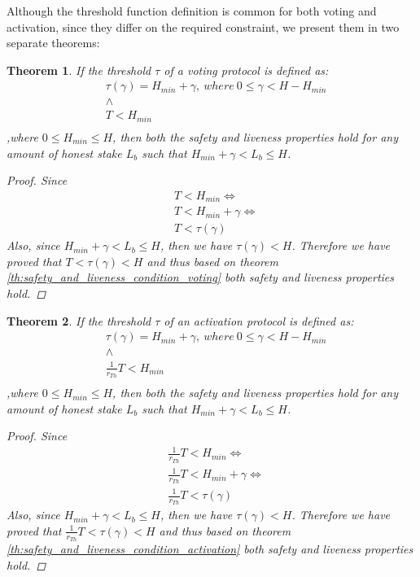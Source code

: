 \documentclass[11pt,a4paper]{article}
\newtheorem{proof}{Proof}
\newtheorem{theorem}{Theorem}
\begin{document}
Although the threshold function definition is common for both voting and
activation, since they differ on the required constraint, we present them in
two separate theorems:
\begin{theorem}\label{th:proposed_voting_threshold}
	If the threshold $\tau$ of a voting protocol is
	defined as:
	\begin{align*}
		&\tau(\gamma) = H_{min} + \gamma,\ where\ 0 \leq \gamma < H-H_{min} \\
		&\land\\
		&T < H_{min}\\
	\end{align*}
,where  $0 \leq H_{min} \leq H$,
then both the safety and liveness properties hold for any amount of honest
stake $L_b$ such that $H_{min} + \gamma < L_b \leq H$.
	\begin{proof}
		Since
		\begin{align*}
			&T < H_{min} \iff\\
			&T < H_{min} + \gamma \iff\\
			&T < \tau(\gamma)
		\end{align*}
		Also, since $H_{min} + \gamma < L_b \leq H$, then we have $\tau(\gamma)
		< H$.
		Therefore we have proved that $T < \tau(\gamma) < H$ and thus
		based on theorem \ref{th:safety_and_liveness_condition_voting} both
		safety
		and
		liveness properties hold.
	\end{proof}
\end{theorem}

\begin{theorem}\label{th:proposed_adoption_threshold}
	If the threshold $\tau$ of an activation protocol is
	defined as:
	\begin{align*}
		&\tau(\gamma) = H_{min} + \gamma,\ where\ 0 \leq \gamma < H-H_{min} \\
		&\land\\
		&\frac{1}{r_{Th}}T < H_{min}\\
	\end{align*}
	,where $0 \leq H_{min} \leq H$,
	then both the safety and liveness properties hold for any amount of honest
	stake $L_b$ such that $H_{min} + \gamma < L_b \leq H$.
	\begin{proof}
		Since
		\begin{align*}
			&\frac{1}{r_{Th}}T < H_{min} \iff\\
			&\frac{1}{r_{Th}}T < H_{min} + \gamma \iff\\
			&\frac{1}{r_{Th}}T < \tau(\gamma)
		\end{align*}
		Also, since $H_{min} + \gamma < L_b \leq H$, then we have $\tau(\gamma)
		< H$.
		Therefore we have proved that $\frac{1}{r_{Th}}T < \tau(\gamma) < H$
		and thus
		based on theorem \ref{th:safety_and_liveness_condition_activation} both
		safety
		and
		liveness properties hold.
	\end{proof}
\end{theorem}
\end{document}
